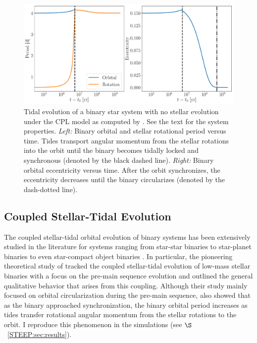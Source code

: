 \begin{figure}
	\includegraphics[width=\textwidth]{eqtide_example.pdf}
    \caption{Tidal evolution of a binary star system with no stellar evolution under the CPL model \citep{FerrazMello2008,Heller2011} as computed by \eqtide.  See the text for the system properties. {\it Left:} Binary orbital and stellar rotational period versus time.  Tides transport angular momentum from the stellar rotations into the orbit until the binary becomes tidally locked and synchronous (denoted by the black dashed line).  {\it Right:} Binary orbital eccentricity versus time.  After the orbit synchronizes, the eccentricity decreases until the binary circularizes (denoted by the dash-dotted line).}
    \label{STEEP:fig:eqtide_example}
\end{figure}


\subsection{Coupled Stellar-Tidal Evolution} \label{STEEP:sec:coupled_evolution} 

The coupled stellar-tidal orbital evolution of binary systems has been extensively studied in the literature for systems ranging from star-star binaries \citep[e.g.][]{Huang1966,Mestel1968,VantVeer1988,Zahn1989,Li1998,Khaliullin2011} to star-planet binaries \cite[e.g.][]{DobbsDixon2004,Barker2009,Lanza2016} to even star-compact object binaries \citep[e.g.][]{Verbunt1981,Repetto2014}.  In particular, the pioneering theoretical study of \citet{Zahn1989} tracked the coupled stellar-tidal evolution of low-mass stellar binaries with a focus on the pre-main sequence evolution and outlined the general qualitative behavior that arises from this coupling.  Although their study mainly focused on orbital circularization during the pre-main sequence, \citet{Zahn1989} also showed that as the binary approached synchronization, the binary orbital period increases as tides transfer rotational angular momentum from the stellar rotations to the orbit.  I reproduce this phenomenon in the simulations (see $\S$~\ref{STEEP:sec:results}).

